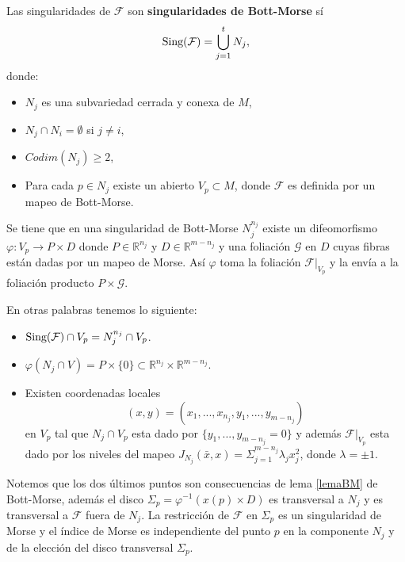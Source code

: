 \documentclass[a4paper,10pt]{book}
\begin{document}
Las singularidades de $\mathcal{F}$ son {\bfseries singularidades de Bott-Morse} s\'i 
$${\rm Sing(\mathcal{F})}=\bigcup_{j=1}^{t}N_{j},$$
donde: 
\begin{itemize}
    \item $N_{j}$ es una subvariedad cerrada y conexa de $M$, 
    \item $N_{j}\cap N_{i}=\emptyset$ si $j\neq i$,
    \item $Codim(N_{j})\geq 2$,
    \item Para cada $p\in N_{j}$ existe un abierto $V_{p}\subset M$, donde $\mathcal{F}$ es definida por un mapeo de Bott-Morse.
\end{itemize}

Se tiene que en una singularidad de Bott-Morse $N_{j}^{n_{j}}$ existe un difeomorfismo $\varphi:V_{p}\to P\times D$ donde $P\in\mathbb{R}^{n_{j}}$ y $D\in\mathbb{R}^{m-n_{j}}$ y una foliaci\'on $\mathcal{G}$ en $D$ cuyas fibras est\'an dadas por un mapeo de Morse. As\'i $\varphi$ toma la foliaci\'on $\mathcal{F}|_{V_{p}}$ y la env\'ia a la foliaci\'on producto $P\times\mathcal{G}$.
\vspace{5mm}

En otras palabras tenemos lo siguiente:

\begin{itemize}
    \item ${\rm Sing(\mathcal{F})}\cap V_{p}=N_{j}^{n_{j}}\cap V_{p}$.
    \item $\varphi(N_{j}\cap V) = P\times \{0\}\subset\mathbb{R}^{n_{j}}\times\mathbb{R}^{m-n_{j}}$.
    \item Existen coordenadas locales 
    $$(x,y)=(x_{1},...,x_{n_{j}}, y_{1},...,y_{m-n_{j}})$$ en  $V_{p}$ tal que $N_{j}\cap V_{p}$ esta dado por  $\{y_{1},...,y_{m-n_{j}}=0\}$ y adem\'as $\mathcal{F}|_{V_{p}}$ esta dado por los niveles del mapeo  $J_{N_{j}}(\bar{x},x)=\Sigma_{j=1}^{m-n_{j}}\lambda_{j}x_{j}^{2}$, donde $\lambda=\pm 1$. 
\end{itemize}

Notemos que los dos \'ultimos puntos son consecuencias de lema \ref{lemaBM} de Bott-Morse, adem\'as el disco $\Sigma_{p}=\varphi^{-1}(x(p)\times D)$ es transversal a $N_{j}$ y es transversal a $\mathcal{F}$ fuera de $N_{j}$. La restricci\'on de $\mathcal{F}$ en $\Sigma_{p}$ es un singularidad de Morse y el \'indice de Morse es independiente del punto $p$ en la componente $N_{j}$ y de la elecci\'on del disco transversal $\Sigma_{p}$.
\vspace{5mm}
\end{document}
